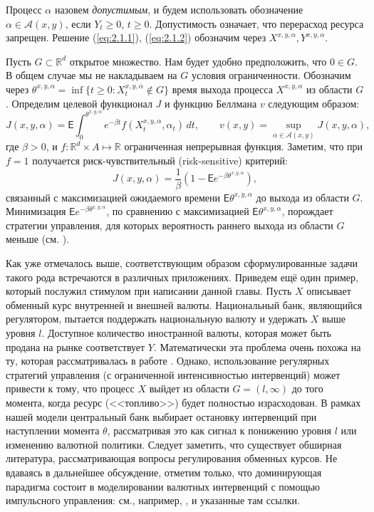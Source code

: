 Процесс $\alpha$ назовем \emph{допустимым}, и будем использовать обозначение $\alpha \in \mathcal A(x,y)$, если $Y_t \ge 0$, $t\ge 0$. Допустимость означает, что перерасход ресурса запрещен. Решение (\ref{eq:2.1.1}), (\ref{eq:2.1.2}) обозначим через $X^{x,y,\alpha}, Y^{x,y,\alpha}$.

Пусть $G\subset \mathbb R^d$ открытое множество. Нам будет удобно предположить, что $0\in G$. В общем случае мы не накладываем на $G$ условия ограниченности. Обозначим через
$\theta^{x,y,\alpha}=\inf\{t\ge 0:X_t^{x,y,\alpha}\not \in G\}$ время выхода процесса $X^{x,y,\alpha}$ из области $G$.
Определим целевой функционал $J$ и функцию Беллмана $v$ следующим образом:
\begin{equation} \label{eq:2.1.3}
J(x,y,\alpha)=\mathsf E\int_0^{\theta^{x,y,\alpha}} e^{-\beta t} f(X_t^{x,y,\alpha},\alpha_t)\,dt, \qquad
   v(x,y)=\sup_{\alpha\in\mathcal A(x,y)} J(x,y,\alpha),
\end{equation}
где $\beta>0$, и $f:\mathbb R^d\times A\mapsto\mathbb R$ ограниченная непрерывная функция. Заметим, что при $f=1$ получается  риск-чувствительный (risk-sensitive) критерий:
\begin{equation} \label{eq:2.1.4}
J(x,y,\alpha)=\frac{1}{\beta}\left(1-\mathsf E e^{-\beta \theta^{x,y,\alpha}}\right),
\end{equation}
связанный с максимизацией ожидаемого времени $\mathsf E \theta^{x,y,\alpha}$ до выхода из области $G$.
Минимизация $\mathsf E e^{-\beta \theta^{x,y,\alpha}}$, по сравнению с максимизацией $\mathsf E \theta^{x,y,\alpha}$, порождает стратегии управления, для которых вероятность раннего выхода из области $G$ меньше (см. \cite{DupMcE97,ClaVin12}).

Как уже отмечалось выше, соответствующим образом сформулированные задачи такого рода встречаются в различных приложениях. Приведем ещё один пример, который послужил стимулом при написании данной главы. Пусть $X$ описывает обменный курс внутренней и внешней валюты. Национальный банк, являющийся регулятором, пытается поддержать национальную валюту и удержать $X$ выше уровня $l$. Доступное количество иностранной валюты, которая может быть продана на рынке соответствует $Y$. Математически эта проблема очень похожа на ту, которая рассматривалась в работе \cite{Jac83}.
Однако, использование регулярных стратегий управления (с ограниченной интенсивностью интервенций) может привести к тому, что процесс $X$ выйдет из области $G=(l,\infty)$ до того момента, когда ресурс (<<топливо>>) будет полностью израсходован. В рамках нашей модели центральный банк выбирает остановку интервенций при наступлении момента $\theta$, рассматривая это как сигнал к понижению уровня $l$ или изменению валютной политики. Следует заметить, что существует обширная литература, рассматривающая вопросы регулирования обменных курсов. Не вдаваясь в дальнейшее обсуждение, отметим только, что доминирующая парадигма состоит в моделировании валютных интервенций с помощью импульсного управления: см., например, \cite{CadZap00, BenLonPerSet12}, и указанные там ссылки.

